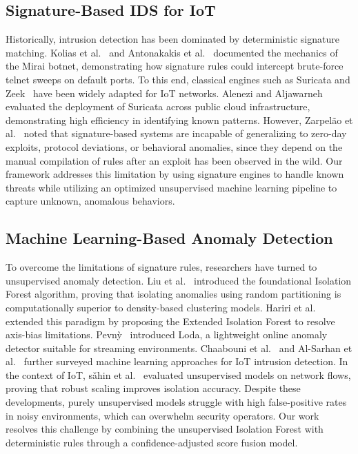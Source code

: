 \documentclass[journal]{IEEEtran}
\begin{document}
\subsection{Signature-Based IDS for IoT}
Historically, intrusion detection has been dominated by deterministic signature matching. Kolias et al.~\cite{kolias2017ddos} and Antonakakis et al.~\cite{antonakakis2017understanding} documented the mechanics of the Mirai botnet, demonstrating how signature rules could intercept brute-force telnet sweeps on default ports. To this end, classical engines such as Suricata and Zeek~\cite{paxson1999bro} have been widely adapted for IoT networks. Alenezi and Aljawarneh~\cite{suricata2018open} evaluated the deployment of Suricata across public cloud infrastructure, demonstrating high efficiency in identifying known patterns. However, Zarpel{\~a}o et al.~\cite{zarpelao2017survey} noted that signature-based systems are incapable of generalizing to zero-day exploits, protocol deviations, or behavioral anomalies, since they depend on the manual compilation of rules after an exploit has been observed in the wild. Our framework addresses this limitation by using signature engines to handle known threats while utilizing an optimized unsupervised machine learning pipeline to capture unknown, anomalous behaviors.

\subsection{Machine Learning-Based Anomaly Detection}
To overcome the limitations of signature rules, researchers have turned to unsupervised anomaly detection. Liu et al.~\cite{liu2008isolation, liu2012isolation} introduced the foundational Isolation Forest algorithm, proving that isolating anomalies using random partitioning is computationally superior to density-based clustering models. Hariri et al.~\cite{hariri2021extended} extended this paradigm by proposing the Extended Isolation Forest to resolve axis-bias limitations. Pevn{\`y}~\cite{pevny2016loda} introduced Loda, a lightweight online anomaly detector suitable for streaming environments. Chaabouni et al.~\cite{chaabouni2019network} and Al-Sarhan et al.~\cite{alsarhan2023explainable} further surveyed machine learning approaches for IoT intrusion detection. In the context of IoT, s{\v{a}}hin et al.~\cite{sahin2021unsupervised} evaluated unsupervised models on network flows, proving that robust scaling improves isolation accuracy. Despite these developments, purely unsupervised models struggle with high false-positive rates in noisy environments, which can overwhelm security operators. Our work resolves this challenge by combining the unsupervised Isolation Forest with deterministic rules through a confidence-adjusted score fusion model.
\end{document}
